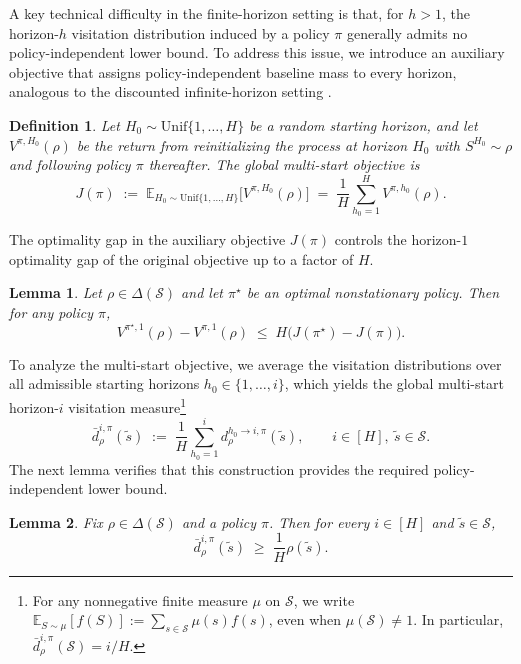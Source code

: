 \documentclass[11pt]{article}
\newtheorem{defi}{Definition}
\newtheorem{lem}{Lemma}
\begin{document}
A key technical difficulty in the finite-horizon setting is that, for $h>1$,
the horizon-$h$ visitation distribution induced by a policy $\pi$ generally
admits no policy-independent lower bound. To address this issue, we introduce an auxiliary objective that assigns
policy-independent baseline mass to every horizon, analogous to the
discounted infinite-horizon setting \citep{xiao2022convergence}.
\begin{defi}
\label{def:global_multistart_J}
Let $H_0\sim\mathrm{Unif}\{1,\dots,H\}$ be a random starting horizon, and let
$V^{\pi,H_0}(\rho)$ be the return from reinitializing the process at horizon
$H_0$ with $S^{H_0}\sim\rho$ and following policy $\pi$ thereafter. The global
multi-start objective is
\begin{equation}
\label{eq:global_multistart_J}
J(\pi)
\;:=\;
\mathbb E_{H_0\sim \mathrm{Unif}\{1,\dots,H\}}\!\big[V^{\pi,H_0}(\rho)\big]
\;=\;
\frac{1}{H}\sum_{h_0=1}^H V^{\pi,h_0}(\rho).
\end{equation}
\end{defi}
The optimality gap in the auxiliary objective $J(\pi)$ controls the
horizon-$1$ optimality gap of the original objective up to a factor of $H$.
\begin{lem}
\label{lem:standard_gap_vs_J_gap}
Let $\rho\in\Delta(\mathcal S)$ and let $\pi^\star$ be an optimal
nonstationary policy. Then for any policy $\pi$,
\begin{equation}
\label{eq:standard_gap_vs_J_gap}
V^{\pi^\star,1}(\rho)-V^{\pi,1}(\rho)
\;\le\;
H\big(J(\pi^\star)-J(\pi)\big).
\end{equation}
\end{lem}
To analyze the multi-start objective, we average the visitation distributions
over all admissible starting horizons $h_0\in\{1,\dots,i\}$, which yields the
global multi-start horizon-$i$ visitation measure\footnote{For any nonnegative
finite measure $\mu$ on $\mathcal S$, we write
$\mathbb E_{S\sim\mu}[f(S)]:=\sum_{s\in\mathcal S}\mu(s)f(s)$, even when
$\mu(\mathcal S)\ne1$. In particular, $\bar d^{i,\pi}_\rho(\mathcal S)=i/H$.}
\begin{equation}
\label{eq:bar_d_global}
\bar d^{i,\pi}_\rho(\tilde{s})
\;:=\;
\frac{1}{H}\sum_{h_0=1}^i d^{h_0\to i,\pi}_\rho(\tilde{s}),
\qquad i\in[H],\ \tilde{s}\in\mathcal S.
\end{equation}
The next lemma verifies that this construction provides the required
policy-independent lower bound.
\begin{lem}
\label{lem:global_floor}
Fix $\rho\in\Delta(\mathcal S)$ and a policy $\pi$. Then for every $i\in[H]$
and $\tilde{s}\in\mathcal S$,
\begin{equation}
\label{eq:global_floor}
\bar d^{i,\pi}_\rho(\tilde{s})
\;\ge\;
\frac{1}{H}\rho(\tilde{s}).
\end{equation}
\end{lem}
\end{document}
